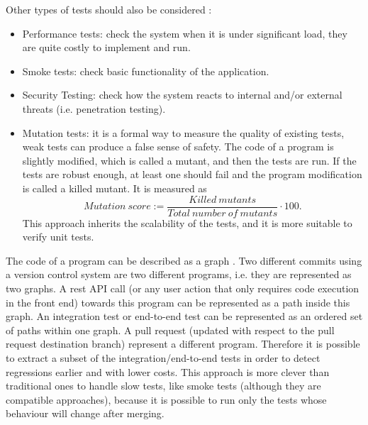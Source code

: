 \documentclass[12pt,english]{article} %
\begin{document}
Other types of tests should also be considered \cite{types-of-software-testing}:
\begin{itemize}
	\item Performance tests: check the system when it is under significant load, they are quite costly to implement and run. %
	\item Smoke tests: check basic functionality of the application. %
	\item Security Testing: check how the system reacts to internal and/or external threats (i.e. penetration testing). %
	\item Mutation tests: it is a formal way to measure the quality of existing tests, weak tests can produce a false sense of safety.
	The code of a program is slightly modified, which is called a mutant, and then the tests are run.
	If the tests are robust enough, at least one should fail and the program modification is called a killed mutant.
	It is measured as
	$$Mutation\ score := \frac{Killed\ mutants}{Total\ number\ of\ mutants} \cdot 100.$$
	This approach inherits the scalability of the tests, and it is more suitable to verify unit tests.
\end{itemize}

The code of a program can be described as a graph \cite{regression-test-selection}.
Two different commits using a version control system are two different programs, i.e. they are represented as two graphs.
A rest API call (or any user action that only requires code execution in the front end) towards this program can be represented as a path inside this graph.
An integration test or end-to-end test can be represented as an ordered set of paths within one graph.
A pull request (updated with respect to the pull request destination branch) represent a different program. Therefore it is possible to extract a subset of the integration/end-to-end tests in order to detect regressions earlier and with lower costs.
This approach is more clever than traditional ones to handle slow tests, like smoke tests (although they are compatible approaches), because it is possible to run only the tests whose behaviour will change after merging.

\
\end{document}
